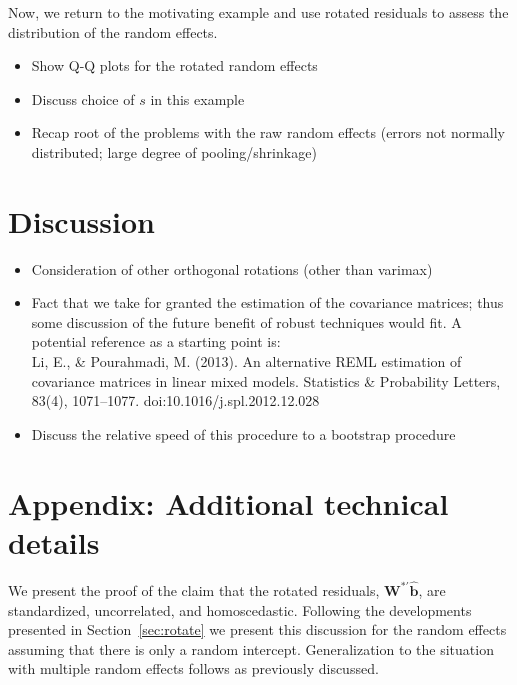 \documentclass{article} %
\newcommand{\al}[1]{{\color{red} #1}}
\begin{document}
Now, we return to the motivating example and use rotated residuals to assess the distribution of the random effects.

\begin{itemize}
\item Show Q-Q plots for the rotated random effects
\item Discuss choice of $s$ in this example
\item Recap root of the problems with the raw random effects (errors not normally distributed; large degree of pooling/shrinkage)
\end{itemize}

\section{Discussion}\label{sec:discussion}

\begin{itemize}
\item Consideration of other orthogonal rotations (other than varimax)
\item Fact that we take for granted the estimation of the covariance matrices; thus some discussion of the future benefit of robust techniques would fit. A potential reference as a starting point is:\\ Li, E., \& Pourahmadi, M. (2013). An alternative REML estimation of covariance matrices in linear mixed models. Statistics \& Probability Letters, 83(4), 1071--1077. doi:10.1016/j.spl.2012.12.028
\item Discuss the relative speed of this procedure to a bootstrap procedure
\end{itemize}

\section*{Appendix: Additional technical details}

\al{
We present the proof of the claim that the rotated residuals, $\bm{W}^{*\prime} \widehat{\bm{b}}$, are standardized, uncorrelated, and homoscedastic. Following the developments presented in Section~\ref{sec:rotate} we present this discussion for the random effects assuming that there is only a random intercept. Generalization to the situation with multiple random effects follows as previously discussed.
}
\end{document}
